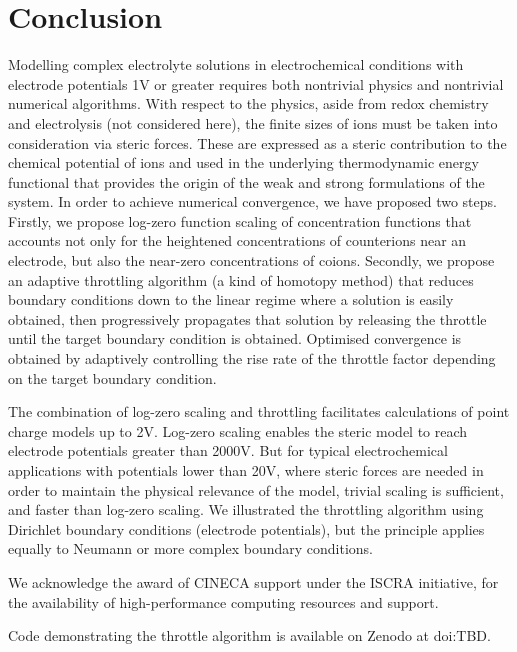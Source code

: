\section{Conclusion}

Modelling complex electrolyte solutions in electrochemical conditions
with electrode potentials 1V or greater requires both nontrivial
physics and nontrivial numerical algorithms.
With respect to the
physics, aside from redox chemistry and electrolysis (not considered
here), the finite sizes of ions must be taken into consideration via
steric forces. These are expressed as a steric contribution to the
chemical potential of ions and used in the underlying thermodynamic
energy functional that provides the origin of the weak and strong
formulations of the system.
In order to achieve numerical convergence, we have proposed two
steps. Firstly, we propose log-zero function scaling of
concentration functions that accounts
not only for the heightened concentrations of counterions near an
electrode, but also the near-zero concentrations of coions. Secondly,
we propose an adaptive throttling algorithm (a kind of homotopy
method) that reduces boundary conditions 
down to the linear regime where a solution is easily obtained, then
progressively propagates that solution by releasing the throttle
until the target boundary condition is obtained. Optimised convergence
is obtained by adaptively controlling the rise rate of the throttle factor
depending on the target boundary condition.

The combination of
log-zero scaling and throttling facilitates calculations of point
charge models up to 2V. Log-zero scaling enables
the steric model to reach electrode potentials greater than 2000V.
But for typical electrochemical applications with potentials lower than 20V,
where steric forces are needed in order to maintain the physical relevance
of the model, trivial scaling is sufficient, and faster than log-zero scaling.
We illustrated the throttling algorithm using Dirichlet boundary
conditions (electrode potentials), but the  principle applies
equally to Neumann or more complex boundary conditions.

\begin{acknowledgement}
  We acknowledge the award of CINECA support under the ISCRA
  initiative, for the availability of high-performance computing
  resources and support.

  Code demonstrating the throttle algorithm is available on Zenodo at doi:TBD.
\end{acknowledgement}





